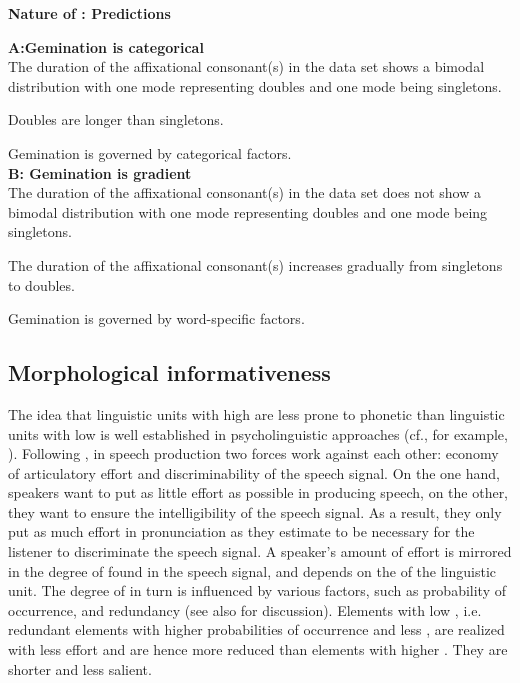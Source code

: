 {{\noindent \textbf{Nature of : Predictions}\\	\label{predictions nature of gemination}

\noindent \textbf{A:\hspace{0.5cm}Gemination is categorical} \\



\noindent	The duration of the affixational consonant(s) in the data set shows a bimodal distribution with one mode representing doubles and one mode being singletons.
	
\noindent	Doubles are longer than singletons. 
	
\noindent	Gemination is governed by categorical factors.	\\



\noindent	\textbf{B: \hspace{0.5cm}Gemination is gradient} \\
		
\noindent	The duration of the affixational consonant(s) in the data set does not show a bimodal distribution with one mode representing doubles and one mode being singletons. 

\noindent	The duration of the affixational consonant(s) increases gradually from singletons to doubles.  
	
\noindent	Gemination is governed by word-specific factors.
	



\subsection{Morphological informativeness} \label{morphological informativeness}

The idea that linguistic units with high  are less prone to phonetic  than linguistic units with low  is well established in psycholinguistic approaches  (cf., for example, \citealt{Aylett.2004,Kuperman.2007,Pluymaekers.2010,Hanique.2012}). Following \cite{Lindblom.1990}, in speech production two forces work against each other: economy of articulatory effort and discriminability of the speech signal. On the one hand, speakers want to put as little effort as possible in producing speech, on the other, they want to ensure the intelligibility of the speech signal. As a result, they only put as much effort in pronunciation as they estimate to be necessary for the listener to discriminate the speech signal. A speaker's amount of effort is mirrored in the degree of  found in the speech signal, and depends on the  of the linguistic unit. The degree of  in turn is influenced by various factors, such as probability of occurrence,  and redundancy (see also \cite{Kuperman.2007} for discussion).  
Elements with low , i.e. redundant elements with higher probabilities of occurrence and less , are realized with less effort and are hence more reduced than elements with higher . They are shorter and less salient. 

}}
